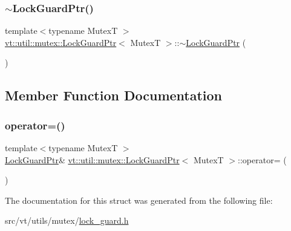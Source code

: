 \subsubsection{\texorpdfstring{$\sim$\+Lock\+Guard\+Ptr()}{~LockGuardPtr()}}
{\footnotesize\ttfamily template$<$typename MutexT $>$ \\
\hyperlink{structvt_1_1util_1_1mutex_1_1_lock_guard_ptr}{vt\+::util\+::mutex\+::\+Lock\+Guard\+Ptr}$<$ MutexT $>$\+::$\sim$\hyperlink{structvt_1_1util_1_1mutex_1_1_lock_guard_ptr}{Lock\+Guard\+Ptr} (\begin{DoxyParamCaption}{ }\end{DoxyParamCaption})\hspace{0.3cm}{\ttfamily [inline]}}



\subsection{Member Function Documentation}
\mbox{\label{structvt_1_1util_1_1mutex_1_1_lock_guard_ptr_a17f01073ff7844fc0215758035ff74fb}} 
\subsubsection{\texorpdfstring{operator=()}{operator=()}}
{\footnotesize\ttfamily template$<$typename MutexT $>$ \\
\hyperlink{structvt_1_1util_1_1mutex_1_1_lock_guard_ptr}{Lock\+Guard\+Ptr}\& \hyperlink{structvt_1_1util_1_1mutex_1_1_lock_guard_ptr}{vt\+::util\+::mutex\+::\+Lock\+Guard\+Ptr}$<$ MutexT $>$\+::operator= (\begin{DoxyParamCaption}\item[{\hyperlink{structvt_1_1util_1_1mutex_1_1_lock_guard_ptr}{Lock\+Guard\+Ptr}$<$ MutexT $>$ const \&}]{ }\end{DoxyParamCaption})\hspace{0.3cm}{\ttfamily [delete]}}



The documentation for this struct was generated from the following file\+:\begin{DoxyCompactItemize}
\item 
src/vt/utils/mutex/\hyperlink{lock__guard_8h}{lock\+\_\+guard.\+h}\end{DoxyCompactItemize}
